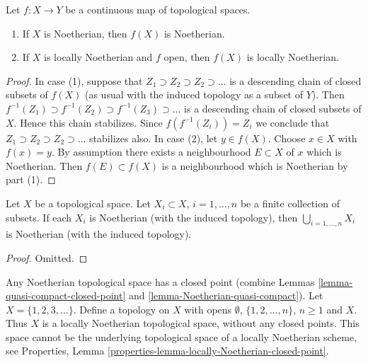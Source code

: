 \begin{lemma}
\label{lemma-image-Noetherian}
Let $f : X \to Y$ be a continuous map of topological spaces.
\begin{enumerate}
\item If $X$ is Noetherian, then $f(X)$ is Noetherian.
\item If $X$ is locally Noetherian and $f$ open, then $f(X)$ is
locally Noetherian.
\end{enumerate}
\end{lemma}

\begin{proof}
In case (1), suppose that $Z_1 \supset Z_2 \supset Z_2 \supset \ldots$
is a descending chain of closed subsets of $f(X)$ (as usual with the induced
topology as a subset of $Y$). Then
$f^{-1}(Z_1) \supset f^{-1}(Z_2) \supset f^{-1}(Z_3) \supset \ldots$ is
a descending chain of closed subsets of $X$. Hence this chain stabilizes.
Since $f(f^{-1}(Z_i)) = Z_i$ we conclude that
$Z_1 \supset Z_2 \supset Z_2 \supset \ldots$
stabilizes also. In case (2), let $y \in f(X)$. Choose $x \in X$ with
$f(x) = y$. By assumption there exists a neighbourhood $E \subset X$ of
$x$ which is Noetherian. Then $f(E) \subset f(X)$ is a neighbourhood
which is Noetherian by part (1).
\end{proof}

\begin{lemma}
\label{lemma-finite-union-Noetherian}
Let $X$ be a topological space.
Let $X_i \subset X$, $i = 1, \ldots, n$ be a finite collection of subsets.
If each $X_i$ is Noetherian (with the induced topology), then
$\bigcup_{i = 1, \ldots, n}  X_i$ is Noetherian (with the induced topology).
\end{lemma}

\begin{proof}
Omitted.
\end{proof}

\begin{example}
\label{example-locally-Noetherian-no-closed-point}
Any Noetherian topological space has a closed point (combine
Lemmas \ref{lemma-quasi-compact-closed-point} and
\ref{lemma-Noetherian-quasi-compact}).
Let $X = \{1, 2, 3, \ldots \}$. Define a topology on $X$
with opens $\emptyset$, $\{1, 2, \ldots, n\}$, $n \geq 1$
and $X$. Thus $X$ is a locally Noetherian topological space,
without any closed points. This space cannot be the underlying
topological space of a locally Noetherian scheme, see
Properties, Lemma \ref{properties-lemma-locally-Noetherian-closed-point}.
\end{example}

